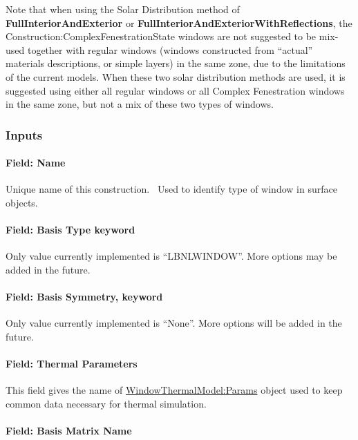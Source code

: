 Note that when using the Solar Distribution method of \textbf{FullInteriorAndExterior} or \textbf{FullInteriorAndExteriorWithReflections}, the Construction:ComplexFenestrationState windows are not suggested to be mix-used together with regular windows (windows constructed from ``actual'' materials descriptions, or simple layers) in the same zone, due to the limitations of the current models. When these two solar distribution methods are used, it is suggested using either all regular windows or all Complex Fenestration windows in the same zone, but not a mix of these two types of windows.

\subsubsection{Inputs}\label{inputs-39}

\paragraph{Field: Name}\label{field-name-32-000}

Unique name of this construction.~ Used to identify type of window in surface objects.

\paragraph{Field: Basis Type keyword}\label{field-basis-type-keyword}

Only value currently implemented is ``LBNLWINDOW''. More options may be added in the future.

\paragraph{Field: Basis Symmetry, keyword}\label{field-basis-symmetry-keyword}

Only value currently implemented is ``None''. More options will be added in the future.

\paragraph{Field: Thermal Parameters}\label{field-thermal-parameters}

This field gives the name of \hyperref[windowthermalmodelparams]{WindowThermalModel:Params} object used to keep common data necessary for thermal simulation.

\paragraph{Field: Basis Matrix Name}\label{field-basis-matrix-name}

